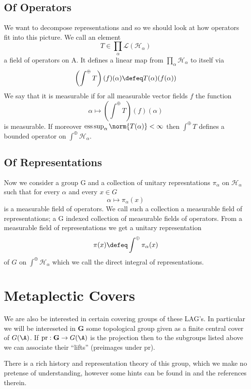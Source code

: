     \subsection{Of Operators}
    We want to decompose representations and so we should look at how operators fit into this picture. We call an element 
    \[T\in \prod_\alpha \mathcal{L(H_\alpha)}\]
    a field of operators on A. It defines a linear map from \(\prod_\alpha \mathcal{H}_\alpha\) to itself via 
    \[ \left(\int^\oplus T\right)(f)(\alpha) \defeq T(\alpha)(f(\alpha)) \]
    We say that it is measurable if for all measurable vector fields \(f\) the function 
    \[\alpha \mapsto \left(\int^\oplus T\right)(f)(\alpha)\]
    is measurable. If moreover \(\mathrm{ess}\sup_\alpha \norm{T(\alpha)} <\infty\) then \(\int^\oplus T\) defines a bounded operator on \(\int^\oplus \mathcal{H}_\alpha\).

    \subsection{Of Representations}
    Now we consider a group G and a collection of unitary represntations \(\pi_\alpha\) on \(\mathcal{H}_\alpha\) such that for every \(\alpha\)  and every \(x\in G\)
    \[\alpha \mapsto \pi_\alpha(x)\]
    is a measurable field of operators. We call such a collection a measurable field of representations; a G indexed collection of measurable fields of operators. From a measurable field of representations we get a unitary representation 
    \[\pi(x) \defeq \int^\oplus \pi_\alpha(x)\]
    of \(G\) on \(\int^\oplus \mathcal{H}_\alpha\) which we call the direct integral of representations. 





    
    \section{Metaplectic Covers}
    We are also be interested in certain covering groups of these LAG's. In particular \cite[I.1.1]{moeglinSpectralDecompositionEisenstein1995} we will be intereseted in \(\mathbf{G}\) some topological group given as a finite central cover of \(G(\A)\). If \(\mathrm{pr}: \mathbf{G} \to G(\A)\) is the projection then to the subgroups listed above we can associate their ``lifts'' (preimages under \(\mathrm{pr}\)). 

\begin{example}
    
    There is a rich history and representation theory of this group, which we make no pretense of understanding, however some hints can be found in \cite{kudlaNOTESLOCALTHETA} and the references therein.
\end{example}

